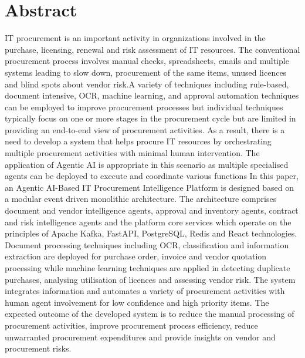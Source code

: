 \vspace{1in}
\chapter*{Abstract}


IT procurement is an important activity in organizations involved in the purchase, licensing, renewal and risk assessment of IT resources. The conventional procurement process involves manual checks, spreadsheets, emails and multiple systems leading to slow down, procurement of the same items, unused licences and blind spots about vendor risk.A variety of techniques including rule-based, document intensive, OCR, machine learning, and approval automation techniques can be employed to improve procurement processes but individual techniques typically focus on one or more stages in the procurement cycle but are limited in providing an end-to-end view of procurement activities. As a result, there is a need to develop a system that helps procure IT resources by orchestrating multiple procurement activities with minimal human intervention.
The application of Agentic AI is appropriate in this scenario as multiple specialised agents can be deployed to execute and coordinate various functions
In this paper, an Agentic AI-Based IT Procurement Intelligence Platform is designed based on a modular event driven monolithic architecture. The architecture comprises document and vendor intelligence agents, approval and inventory agents, contract and risk intelligence agents and the platform core services which operate on the principles of Apache Kafka, FastAPI, PostgreSQL, Redis and React technologies. Document processing techniques including OCR, classification and information extraction are deployed for purchase order, invoice and vendor quotation processing while machine learning techniques are applied in detecting duplicate purchases, analysing utilisation of licences and assessing vendor risk. The system integrates information and automates a variety of procurement activities with human agent involvement for low confidence and high priority items. The expected outcome of the developed system is to reduce the manual processing of procurement activities, improve procurement process efficiency, reduce unwarranted procurement expenditures and provide insights on vendor and procurement risks.